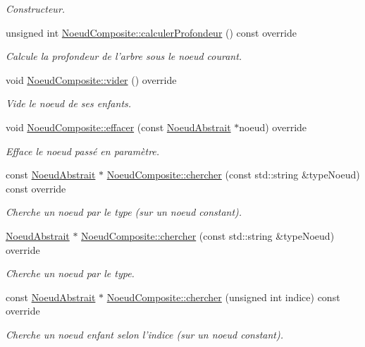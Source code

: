 \begin{DoxyCompactItemize}
\begin{DoxyCompactList}\small\item\em Constructeur. \end{DoxyCompactList}\item 
unsigned int \hyperlink{group__inf2990_ga89492965d116a0ff989ad93114acda57}{Noeud\-Composite\-::calculer\-Profondeur} () const override
\begin{DoxyCompactList}\small\item\em Calcule la profondeur de l'arbre sous le noeud courant. \end{DoxyCompactList}\item 
void \hyperlink{group__inf2990_gaede690fd0ecafe4244479ca4f054a65f}{Noeud\-Composite\-::vider} () override
\begin{DoxyCompactList}\small\item\em Vide le noeud de ses enfants. \end{DoxyCompactList}\item 
void \hyperlink{group__inf2990_gad6e967709392313acafee99a9a05a5a5}{Noeud\-Composite\-::effacer} (const \hyperlink{class_noeud_abstrait}{Noeud\-Abstrait} $\ast$noeud) override
\begin{DoxyCompactList}\small\item\em Efface le noeud passé en paramètre. \end{DoxyCompactList}\item 
const \hyperlink{class_noeud_abstrait}{Noeud\-Abstrait} $\ast$ \hyperlink{group__inf2990_ga54f08be205a89ec9fd9b43bf083b7cbf}{Noeud\-Composite\-::chercher} (const std\-::string \&type\-Noeud) const override
\begin{DoxyCompactList}\small\item\em Cherche un noeud par le type (sur un noeud constant). \end{DoxyCompactList}\item 
\hyperlink{class_noeud_abstrait}{Noeud\-Abstrait} $\ast$ \hyperlink{group__inf2990_gad7f54e2eb26b9ce59fbaedb2d0090f0e}{Noeud\-Composite\-::chercher} (const std\-::string \&type\-Noeud) override
\begin{DoxyCompactList}\small\item\em Cherche un noeud par le type. \end{DoxyCompactList}\item 
const \hyperlink{class_noeud_abstrait}{Noeud\-Abstrait} $\ast$ \hyperlink{group__inf2990_ga18bc4346903226c2fa4370a7b2ef8f4e}{Noeud\-Composite\-::chercher} (unsigned int indice) const override
\begin{DoxyCompactList}\small\item\em Cherche un noeud enfant selon l'indice (sur un noeud constant). \end{DoxyCompactList}\item 

\end{DoxyCompactItemize}
